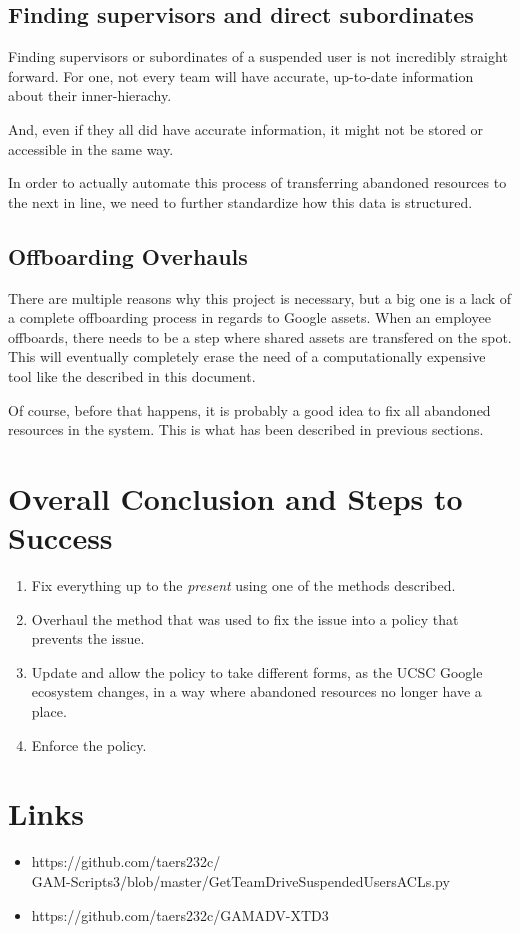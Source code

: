 \documentclass{article}
\begin{document}
\subsection*{Finding supervisors and direct subordinates}
Finding supervisors or subordinates of a suspended user is not incredibly straight forward.
For one, not every team will have accurate, up-to-date information about their inner-hierachy.

And, even if they all did have accurate information, it might not be stored or accessible in the same way.

In order to actually automate this process of transferring abandoned resources to the next in line,
we need to further standardize how this data is structured.

\subsection*{Offboarding Overhauls}
There are multiple reasons why this project is necessary, but a big one is a lack of a complete offboarding process
in regards to Google assets. When an employee offboards, there needs to be a step where shared assets are transfered on the spot.
This will eventually completely erase the need of a computationally expensive tool like the described in this document.

Of course, before that happens, it is probably a good idea to fix all abandoned resources in the system.
This is what has been described in previous sections.

\section*{Overall Conclusion and Steps to Success}
\begin{enumerate}
    \item Fix everything up to the \textit{present} using one of the methods described.
    \item Overhaul the method that was used to fix the issue into a policy that prevents the issue.
    \item Update and allow the policy to take different forms, as the UCSC Google ecosystem changes, in a way where abandoned resources no longer have a place.
    \item Enforce the policy.
\end{enumerate}

\newpage
\section{Links}
\begin{itemize}
    \item https://github.com/taers232c/\\GAM-Scripts3/blob/master/GetTeamDriveSuspendedUsersACLs.py
    \item https://github.com/taers232c/GAMADV-XTD3
\end{itemize}
\end{document}
